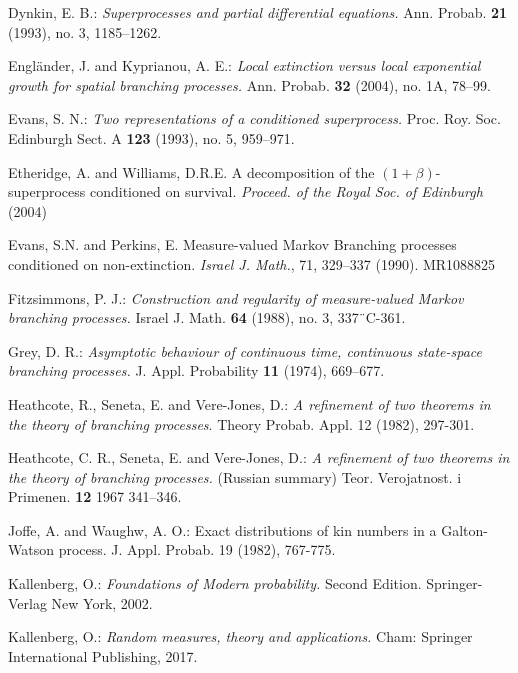 \documentclass[12pt,a4paper]{amsart}
\numberwithin{equation}{section}
\theoremstyle{plain}
\theoremstyle{definition}
\theoremstyle{remark}
\begin{document}
\begin{thebibliography}{99}
Dynkin, E. B.:
\emph{Superprocesses and partial differential equations.}
Ann. Probab. \textbf{21} (1993), no. 3, 1185--1262.

Engl\"ander, J. and Kyprianou, A. E.:
\emph{Local extinction versus local exponential growth for spatial branching processes.}
Ann. Probab. \textbf{32} (2004), no. 1A, 78--99.

Evans, S. N.:
\emph{Two representations of a conditioned superprocess.}
Proc. Roy. Soc. Edinburgh Sect. A \textbf{123} (1993), no. 5, 959--971.

 Etheridge, A. and Williams, D.R.E. A decomposition of the $(1+\beta)$-superprocess conditioned on survival. \emph{Proceed. of the Royal Soc. of Edinburgh} (2004)

 Evans, S.N. and Perkins, E. Measure-valued Markov Branching processes conditioned on non-extinction. \emph{Israel J. Math.}, 71, 329--337 (1990). MR1088825


Fitzsimmons, P. J.:
\emph{Construction and regularity of measure-valued Markov branching processes.}
Israel J. Math. \textbf{64} (1988), no. 3, 337¨C-361.

Grey, D. R.:
\emph{Asymptotic behaviour of continuous time, continuous state-space branching processes.}
J. Appl. Probability \textbf{11} (1974), 669--677.

Heathcote, R.,  Seneta, E.  and Vere-Jones, D.:
\emph{ A refinement of two theorems in the theory of branching processes}.
Theory Probab. Appl. 12 (1982), 297-301.

Heathcote, C. R., Seneta, E. and Vere-Jones, D.:
\emph{A refinement of two theorems in the theory of branching processes.} (Russian summary)
Teor. Verojatnost. i Primenen. \textbf{12} 1967 341--346.



Joffe, A. and Waughw, A. O.:  Exact distributions of kin numbers in a Galton-Watson
process. J. Appl. Probab. 19 (1982), 767-775.

	Kallenberg, O.:
	\emph{Foundations of Modern probability.}
	Second Edition.	Springer-Verlag New York, 2002.
	
	Kallenberg, O.:
	\emph{Random measures, theory and applications.}
	Cham: Springer International Publishing, 2017.


\end{thebibliography}
\end{document}
